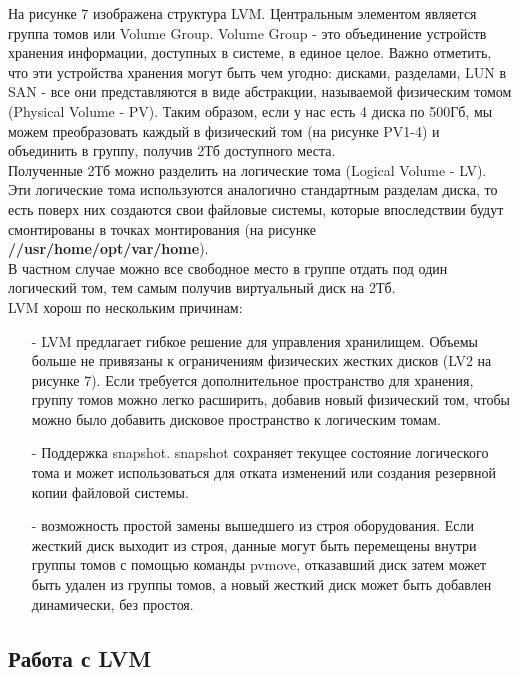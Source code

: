 \documentclass[14pt, a4paper]{article}
\begin{document}
На рисунке 7 изображена структура LVM. Центральным элементом является группа томов или Volume
Group. Volume Group - это объединение устройств хранения информации, доступных в системе, в
единое целое. Важно отметить, что эти устройства хранения могут быть чем угодно: дисками,
разделами, LUN в SAN - все они представляются в виде абстракции, называемой физическим томом
(Physical Volume - PV). Таким образом, если у нас есть 4 диска по 500Гб, мы можем преобразовать
каждый в физический том (на рисунке PV1-4) и объединить в группу, получив 2Тб доступного места.\\

Полученные 2Тб можно разделить на логические тома (Logical Volume - LV). Эти логические тома
используются аналогично стандартным разделам диска, то есть поверх них создаются свои файловые
системы, которые впоследствии будут смонтированы в точках монтирования (на рисунке 
\textbf{//usr/home/opt/var/home}).\\

В частном случае можно все свободное место в группе отдать под один логический том, тем самым
получив виртуальный диск на 2Тб.\\

LVM хорош по нескольким причинам:
\begin{itemize}
    \item[-] LVM предлагает гибкое решение для управления хранилищем. Объемы больше не привязаны
    к ограничениям физических жестких дисков (LV2 на рисунке 7). Если требуется
    дополнительное пространство для хранения, группу томов можно легко расширить, добавив
    новый физический том, чтобы можно было добавить дисковое пространство к логическим
    томам.
    \item[-] Поддержка snapshot. snapshot сохраняет текущее состояние логического тома и может
    использоваться для отката изменений или создания резервной копии файловой системы.
    \item[-] возможность простой замены вышедшего из строя оборудования. Если жесткий диск выходит
    из строя, данные могут быть перемещены внутри группы томов с помощью команды pvmove,
    отказавший диск затем может быть удален из группы томов, а новый жесткий диск может быть
    добавлен динамически, без простоя.
\end{itemize}

\subsection*{Работа с LVM} 
\end{document}
